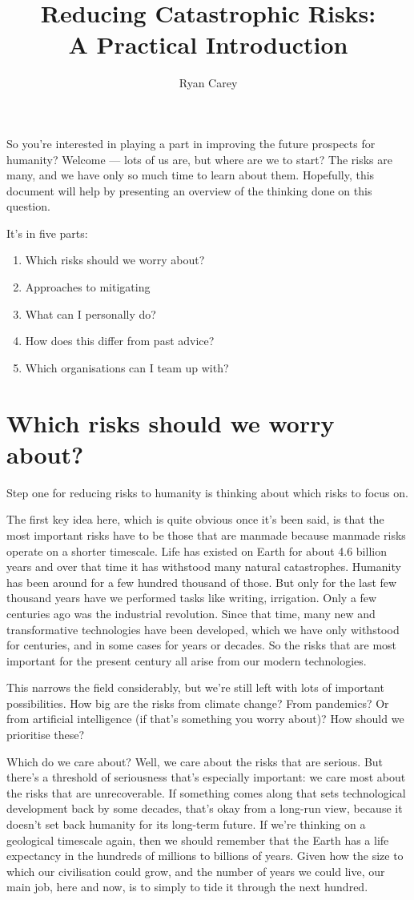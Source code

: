 ﻿\documentclass[12pt]{article}
\title{Reducing Catastrophic Risks:\\ A Practical Introduction}
\author{Ryan Carey}
\begin{document}
\maketitle
So you're interested in playing a part in improving the future prospects for humanity? Welcome --- lots of us are, but 
where are we to start? The risks are many, and we have only so much time to learn about them. Hopefully, this document 
will help by presenting an overview of the thinking done on this question.

It's in five parts: 
\begin{enumerate}
    \item Which risks should we worry about?
    \item Approaches to mitigating 
    \item What can I personally do? 
    \item How does this differ from past advice? 
    \item Which organisations can I team up with?
\end{enumerate}

\section{Which risks should we worry about?}
Step one for reducing risks to humanity is thinking about which risks to focus on. 

The first key idea here, which is quite obvious once it's been said, is that the most important risks have to be those that are 
manmade because manmade risks operate on a shorter timescale. Life has existed on Earth for about 4.6 billion years and 
over that time it has withstood many natural catastrophes.
Humanity has been around for a few hundred thousand of those. But only for the last few thousand years have we performed 
tasks like writing, irrigation. Only a few centuries ago was the industrial revolution. 
Since that time, many new and transformative technologies have been developed, which we have only withstood for centuries, and 
in some cases for years or decades. So the risks that are most important for the present century all arise from our 
modern technologies.

This narrows the field considerably, but we're still left with lots of important possibilities. How big are the risks from climate change? From pandemics? Or from artificial intelligence (if that's something you worry about)? How should we prioritise these?

Which do we care about? Well, we care about the risks that are serious. But there's a threshold of seriousness that's especially important: we care most about the risks that are unrecoverable. If something comes along that sets technological development back by some decades, that's okay from a long-run view, because it doesn't set back humanity for its long-term future. If we're thinking on a geological timescale again, then we should remember that the Earth has a life expectancy in the hundreds of millions to billions of years. Given how the size to which our civilisation could grow, and the number of years we could live, our main job, here and now, is to simply to tide it through the next hundred.
\end{document}
